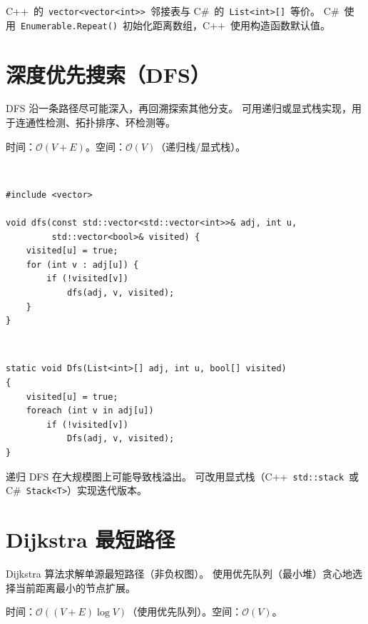 \documentclass[12pt,a4paper,fontset=fandol]{ctexbook}
\newcommand{\cpplabel}{%
  \noindent\begin{tcolorbox}[sharp corners,colback=cppheadbg,colframe=cppheadbg,
    left=6pt,right=6pt,top=2pt,bottom=2pt,boxrule=0pt]
  \textcolor{white}{\small\bfseries\sffamily C++}\end{tcolorbox}%
}
\newcommand{\csharplabel}{%
  \noindent\begin{tcolorbox}[sharp corners,colback=csharpheadbg,colframe=csharpheadbg,
    left=6pt,right=6pt,top=2pt,bottom=2pt,boxrule=0pt]
  \textcolor{white}{\small\bfseries\sffamily C\#}\end{tcolorbox}%
}
\newcommand{\bigO}[1]{\mathcal{O}(#1)}
\newcommand{\Fn}[1]{\texttt{#1()}}
\newcommand{\Tp}[1]{\texttt{#1}}
\begin{document}
\begin{compare}
C++~的~\Tp{vector<vector<int>>}~邻接表与 C\#~的~\Tp{List<int>[]}~等价。
C\#~使用~\Fn{Enumerable.Repeat}~初始化距离数组，C++~使用构造函数默认值。
\end{compare}

\chapter{深度优先搜索（DFS）}

DFS 沿一条路径尽可能深入，再回溯探索其他分支。
可用递归或显式栈实现，用于连通性检测、拓扑排序、环检测等。

\begin{complexitybox}
  时间：$\bigO{V + E}$。空间：$\bigO{V}$（递归栈/显式栈）。
\end{complexitybox}

\cpplabel
\begin{lstlisting}[style=cppstyle]
#include <vector>

void dfs(const std::vector<std::vector<int>>& adj, int u,
         std::vector<bool>& visited) {
    visited[u] = true;
    for (int v : adj[u]) {
        if (!visited[v])
            dfs(adj, v, visited);
    }
}
\end{lstlisting}

\csharplabel
\begin{lstlisting}[style=csharpstyle]
static void Dfs(List<int>[] adj, int u, bool[] visited)
{
    visited[u] = true;
    foreach (int v in adj[u])
        if (!visited[v])
            Dfs(adj, v, visited);
}
\end{lstlisting}

\begin{warning}
递归 DFS 在大规模图上可能导致栈溢出。
可改用显式栈（C++~\Tp{std::stack}~或 C\#~\Tp{Stack<T>}）实现迭代版本。
\end{warning}

\chapter{Dijkstra 最短路径}

Dijkstra 算法求解单源最短路径（非负权图）。
使用优先队列（最小堆）贪心地选择当前距离最小的节点扩展。

\begin{complexitybox}
  时间：$\bigO{(V + E) \log V}$（使用优先队列）。空间：$\bigO{V}$。
\end{complexitybox}
\end{document}
